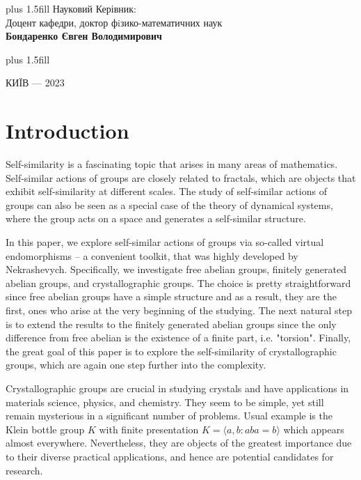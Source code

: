 \documentclass[a4paper,12pt]{amsart}
\theoremstyle{definition}
\begin{document}
	
	\vskip0cm plus 1.5fill
	\hangindent=7cm  \noindent
	Науковий Керівник:\\
	Доцент кафедри, доктор фiзико-математичних наук\\
	{\bf Бондаренко Євген Володимирович}
	
	
	
	\vskip5cm plus 1.5fill
	\begin{center}
		КИЇВ --- 2023
	\end{center}
	
	\newpage
	
	\tableofcontents
	\listoftables
	
	
	\newpage
	
	
	\section{Introduction}
	
	Self-similarity is a fascinating topic that arises in many areas of mathematics.  Self-similar actions of groups are closely related to fractals, which are objects that exhibit self-similarity at different scales. The study of self-similar actions of groups can also be seen as a special case of the theory of dynamical systems, where the group acts on a space and generates a self-similar structure.
	
	In this paper, we explore self-similar actions of groups via so-called virtual endomorphisms -- a convenient toolkit, that was highly developed by Nekrashevych. Specifically, we investigate free abelian groups, finitely generated abelian groups, and crystallographic groups. The choice is pretty straightforward since free abelian groups have a simple structure and as a result, they are the first, ones who arise at the very beginning of the studying. The next natural step is to extend the results to the finitely generated abelian groups since the only difference from free abelian is the existence of a finite part, i.e. "torsion". Finally, the great goal of this paper is to explore the self-similarity of crystallographic groups, which are again one step further into the complexity. 
	
	Crystallographic groups are crucial in studying crystals and have applications in materials science, physics, and chemistry. They seem to be simple, yet still remain mysterious in a significant number of problems. Usual example is the Klein bottle group $K$ with finite presentation $K=\langle a,b : aba=b\rangle$ which appears almost everywhere. Nevertheless, they are objects of the greatest importance due to their diverse practical applications, and hence are potential candidates for research. 
	
\end{document}
